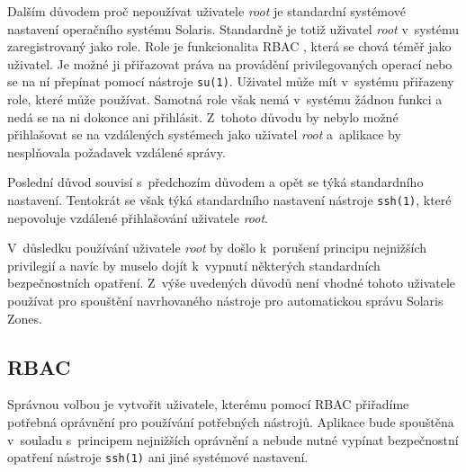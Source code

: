 Dalším důvodem proč nepoužívat uživatele \textit{root} je standardní systémové nastavení operačního systému Solaris. Standardně
je totiž uživatel \textit{root} v~systému zaregistrovaný jako role. Role je funkcionalita RBAC \cite{oracle:solaris:desing:rbac},
která se chová téměř jako uživatel. Je možné ji přiřazovat práva na provádění privilegovaných operací nebo se na ní přepínat pomocí
nástroje \verb|su(1)|. Uživatel může mít v~systému přiřazeny role, které může používat. Samotná role však nemá v~systému žádnou
funkci a nedá se na ni dokonce ani přihlásit. Z~tohoto důvodu by nebylo možné přihlašovat se na vzdálených systémech jako uživatel
\textit{root} a~aplikace by nesplňovala požadavek vzdálené správy.

Poslední důvod souvisí s~předchozím důvodem a opět se týká standardního nastavení. Tentokrát se však týká standardního nastavení nástroje
\verb|ssh(1)|, které nepovoluje vzdálené přihlašování uživatele \textit{root}.

V~důsledku používání uživatele \textit{root} by došlo k~porušení principu nejnižších privilegií 
\cite{cvut:presentations:least_user_privilege} a navíc by muselo dojít k~vypnutí některých standardních bezpečnostních opatření.
Z~výše uvedených důvodů není vhodné tohoto uživatele používat pro spouštění navrhovaného nástroje pro automatickou správu Solaris Zones.
\subsection{RBAC}
\label{chapter:design:security:rbac}
Správnou volbou je vytvořit uživatele, kterému pomocí RBAC přiřadíme potřebná oprávnění pro používání potřebných nástrojů.
Aplikace bude spouštěna v~souladu s~principem nejnižších oprávnění a nebude nutné vypínat bezpečnostní
opatření nástroje \verb|ssh(1)| ani jiné systémové nastavení.